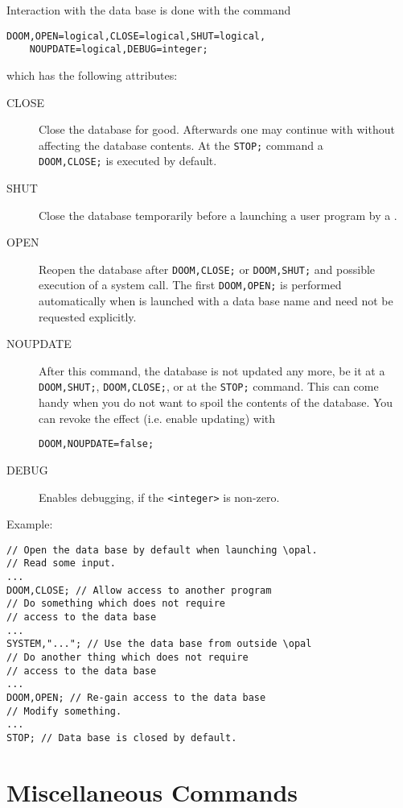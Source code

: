 Interaction with the data base is done with the command
\begin{verbatim}
DOOM,OPEN=logical,CLOSE=logical,SHUT=logical,
	NOUPDATE=logical,DEBUG=integer;
\end{verbatim}
which has the following attributes:
\begin{description}
\item[CLOSE]
  Close the database for good. Afterwards one may continue with \opal without 
  affecting the database contents. At the \texttt{STOP;} command a \\
  \texttt{DOOM,CLOSE;} is executed by default.
\item[SHUT]
  Close the database temporarily before a launching a user program by a
  .
\item[OPEN]
  Reopen the database after \texttt{DOOM,CLOSE;} or \texttt{DOOM,SHUT;} 
  and possible execution of a system call. 
  The first \texttt{DOOM,OPEN;} is performed automatically when \opal 
  is launched with a data base name and need not be requested explicitly. 
\item[NOUPDATE]
  After this command, the database is not updated any more, be it at
  a \texttt{DOOM,SHUT;}, \texttt{DOOM,CLOSE;}, or at the \texttt{STOP;} 
  command. 
  This can come handy when you do not want to spoil the contents of the 
  database. 
  You can revoke the effect (i.e. enable updating) with
\begin{verbatim}
DOOM,NOUPDATE=false;
\end{verbatim}
\item[DEBUG]
  Enables debugging, if the \texttt{<integer>} is non-zero.
\end{description}
\noindent Example:
\begin{verbatim}
// Open the data base by default when launching \opal.
// Read some input.
...
DOOM,CLOSE; // Allow access to another program
// Do something which does not require 
// access to the data base
...
SYSTEM,"..."; // Use the data base from outside \opal
// Do another thing which does not require 
// access to the data base
...
DOOM,OPEN; // Re-gain access to the data base
// Modify something.
...
STOP; // Data base is closed by default.
\end{verbatim}

\section{Miscellaneous Commands}

